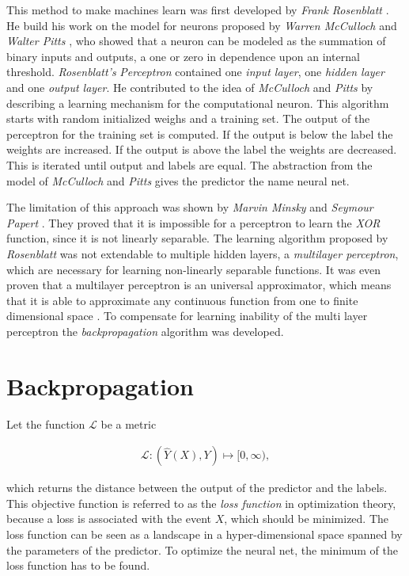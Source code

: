 \documentclass[12pt, a4paper]{thesis}
\begin{document}
This method to make machines learn was first developed by \emph{Frank
  Rosenblatt} \cite{rosenblatt58_percep}. He build his work on the
model for neurons proposed by \emph{Warren McCulloch} and \emph{Walter
  Pitts} \cite{mcculloch43}, who showed that a neuron can be modeled
as the summation of binary inputs and outputs, a one or zero in
dependence upon an internal threshold. \emph{Rosenblatt's}
\emph{Perceptron} contained one \emph{input layer}, one \emph{hidden
  layer} and one \emph{output layer}. He contributed to the idea of
\emph{McCulloch} and \emph{Pitts} by describing a learning mechanism
for the computational neuron. This algorithm starts with random
initialized weighs and a training set. The output of the perceptron for
the training set is computed. If the output is below the label the
weights are increased. If the output is above the label the weights
are decreased. This is iterated until output and labels are equal. The
abstraction from the model of \emph{McCulloch} and \emph{Pitts} gives
the predictor the name neural net.

The limitation of this approach was shown by \emph{Marvin Minsky} and
\emph{Seymour Papert} \cite{newell69_percep}. They proved that it is
impossible for a perceptron to learn the \emph{XOR} function, since it
is not linearly separable. The learning algorithm proposed by
\emph{Rosenblatt} was not extendable to multiple hidden layers, a
\emph{multilayer perceptron}, which are necessary for learning
non-linearly separable functions. It was even proven that a multilayer
perceptron is an universal approximator, which means that it is able
to approximate any continuous function from one to finite dimensional
space \cite{hornik89}. To compensate for learning inability of the
multi layer perceptron the \emph{backpropagation} algorithm was
developed.

\section{Backpropagation}
\label{sec:org8847e0d}

Let the function \(\mathcal{L}\) be a metric

\begin{align}
  \mathcal{L}: \left(\hat{Y}(X), Y\right) \mapsto [0, \infty),
\end{align}

which returns the distance between the output of the predictor and the
labels. This objective function is referred to as the \emph{loss
  function} in optimization theory, because a loss is associated with
the event \(X\), which should be minimized.  The loss function can be
seen as a landscape in a hyper-dimensional space spanned by the
parameters of the predictor. To optimize the neural net, the minimum
of the loss function has to be found.
\end{document}
